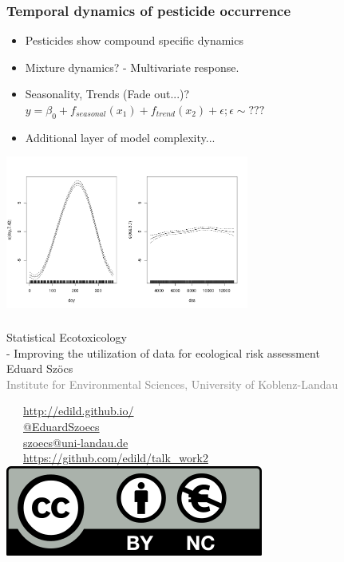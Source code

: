 \documentclass[12pt
, t
]{beamer}
\begin{document}
\begin{frame}
\frametitle{Temporal dynamics of pesticide occurrence}
\begin{itemize}
\item Pesticides show compound specific dynamics
\item Mixture dynamics? - Multivariate response. \pause
\item Seasonality, Trends (Fade out...)? 
$y = \beta_0 + f_{seasonal}(x_1) + f_{trend}(x_2) + \epsilon;  \epsilon \sim ???$
\pause
\item Additional layer of model complexity...
\end{itemize}
\centering
\includegraphics[width =0.6\textwidth]{fig/gam1.png}


\end{frame}




\begin{frame}[plain]
\frametitle{}
\vspace{1em}
\begin{centering}
\Large \textcolor{title}{Statistical Ecotoxicology \\ - Improving the utilization of data for ecological risk assessment} \\[1em]
Eduard Szöcs \\[0.3em]
\tiny \textcolor{gray}{Institute for Environmental Sciences, University of Koblenz-Landau} \\[3em]
\end{centering}
\normalsize
\textcolor{hilight}{\faLaptop}~~~\href{http://edild.github.io/}{http://edild.github.io/ }\\[.5em]
\textcolor{hilight}{\faTwitter}~~~\href{http://twitter.com/EduardSzoecs}{@EduardSzoecs} 	\\[0.5em]
\textcolor{hilight}{\faEnvelope}~~~\href{mailto:szoecs@uni-landau.de}{szoecs@uni-landau.de} \\[.5em]
\textcolor{hilight}{\faGift}~~~\href{https://github.com/edild/talk_work2}{https://github.com/edild/talk\_work2}\\[0.5em]
\hfill \includegraphics[width =.3\textwidth]{fig/Cc-by-nc_euro_icon.png} 
\end{frame}
\end{document}
